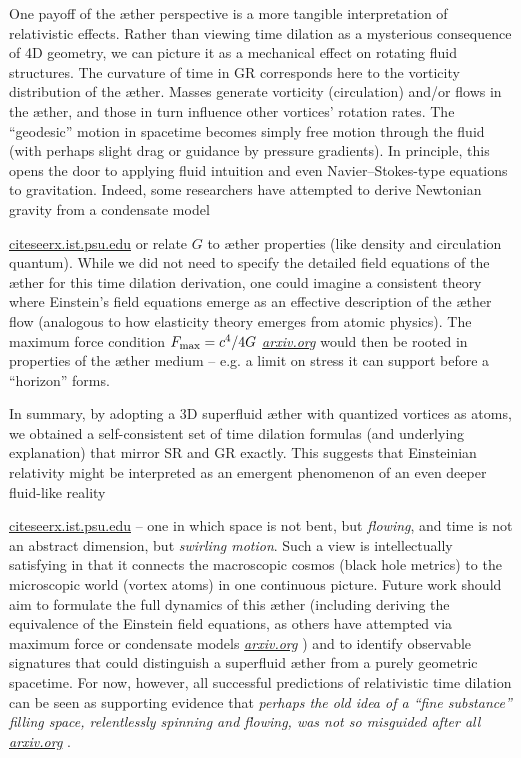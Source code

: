 \documentclass[aps,preprint,superscriptaddress]{revtex4}
\begin{document}
One payoff of the æther perspective is a more tangible interpretation of relativistic effects. Rather than viewing time dilation as a mysterious consequence of 4D geometry, we can picture it as a mechanical effect on rotating fluid structures. The curvature of time in GR corresponds here to the vorticity distribution of the æther. Masses generate vorticity (circulation) and/or flows in the æther, and those in turn influence other vortices’ rotation rates. The “geodesic” motion in spacetime becomes simply free motion through the fluid (with perhaps slight drag or guidance by pressure gradients). In principle, this opens the door to applying fluid intuition and even Navier–Stokes-type equations to gravitation. Indeed, some researchers have attempted to derive Newtonian gravity from a condensate model

\href{https://citeseerx.ist.psu.edu/document?repid=rep1&type=pdf&doi=25483f1ebc9dc442a9f1505a49d96eb35e92e3f4#:~:text=10,2002}{citeseerx.ist.psu.edu}
 or relate $G$ to æther properties (like density and circulation quantum). While we did not need to specify the detailed field equations of the æther for this time dilation derivation, one could imagine a consistent theory where Einstein’s field equations emerge as an effective description of the æther flow (analogous to how elasticity theory emerges from atomic physics). The maximum force condition ${F_{\rm max}=c^4/4G}$ \href{https://arxiv.org/abs/2205.06302#:~:text=the%20principle%20of%20maximum%20force,The%20limits%20illuminate}{\textit{arxiv.org}}
 would then be rooted in properties of the æther medium – e.g. a limit on stress it can support before a “horizon” forms.


In summary, by adopting a 3D superfluid æther with quantized vortices as atoms, we obtained a self-consistent set of time dilation formulas (and underlying explanation) that mirror SR and GR exactly. This suggests that Einsteinian relativity might be interpreted as an emergent phenomenon of an even deeper fluid-like reality

\href{https://citeseerx.ist.psu.edu/document?repid=rep1&type=pdf&doi=25483f1ebc9dc442a9f1505a49d96eb35e92e3f4#:~:text=45,on%20General%20Relativity%20and%20Relativistic}{citeseerx.ist.psu.edu}
 – one in which space is not bent, but \textit{flowing}, and time is not an abstract dimension, but \textit{swirling motion}. Such a view is intellectually satisfying in that it connects the macroscopic cosmos (black hole metrics) to the microscopic world (vortex atoms) in one continuous picture. Future work should aim to formulate the full dynamics of this æther (including deriving the equivalence of the Einstein field equations, as others have attempted via maximum force or condensate models
\href{https://arxiv.org/abs/2205.06302#:~:text=the%20principle%20of%20maximum%20force,The%20limits%20illuminate}{\textit{arxiv.org}}
) and to identify observable signatures that could distinguish a superfluid æther from a purely geometric spacetime. For now, however, all successful predictions of relativistic time dilation can be seen as supporting evidence that \textit{perhaps the old idea of a “fine substance” filling space, relentlessly spinning and flowing, was not so misguided after all}
\href{https://arxiv.org/pdf/2012.07395#:~:text=Thomson%20on%20the%20right%20path%20when}{\textit{arxiv.org}}
.
\end{document}
